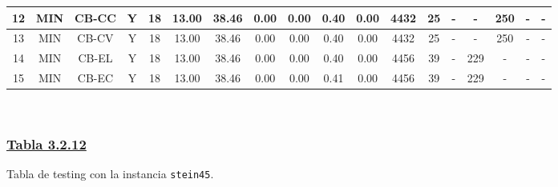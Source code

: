 {\begin{tabular}{ *{17}{c|} c }
\hline
12 & MIN & CB-CC & Y & 18 & 13.00 & 38.46 & 0.00 & 0.00 & 0.40 & 0.00 & 4432 & 25 & - & - & 250 & - & -\\
\hline
13 & MIN & CB-CV & Y & 18 & 13.00 & 38.46 & 0.00 & 0.00 & 0.40 & 0.00 & 4432 & 25 & - & - & 250 & - & -\\
\hline
14 & MIN & CB-EL & Y & 18 & 13.00 & 38.46 & 0.00 & 0.00 & 0.40 & 0.00 & 4456 & 39 & - & 229 & - & - & -\\
\hline
15 & MIN & CB-EC & Y & 18 & 13.00 & 38.46 & 0.00 & 0.00 & 0.41 & 0.00 & 4456 & 39 & - & 229 & - & - & -\\
\hline
\end{tabular}\\
\vspace{4mm}
}

\subsubsection*{\underline{Tabla 3.2.12}}
\noindent Tabla de testing con la instancia \verb_stein45_.\\

